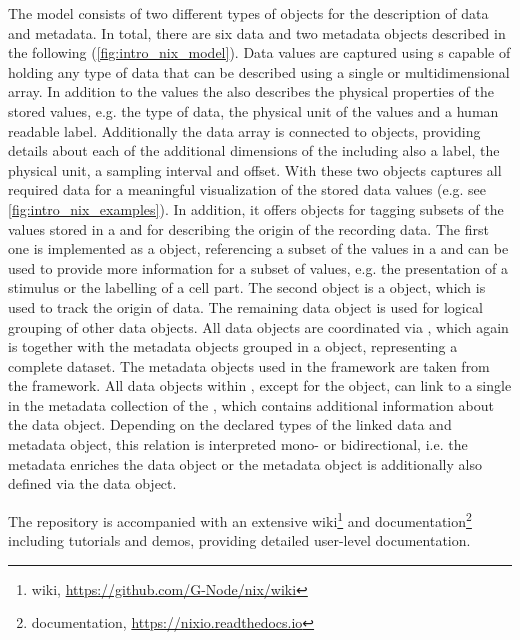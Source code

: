 The  model consists of two different types of objects for the description of data and metadata. In total, there are six data and two metadata objects  described in the following (\ref{fig:intro_nix_model}).
Data values are captured using s capable of holding any type of data that can be described using a single or multidimensional array. In addition to the values the  also describes the physical properties of the stored values, e.g. the type of data, the physical unit of the values and a human readable label. Additionally the data array is connected to  objects, providing details about each of the additional dimensions of the  including also a label, the physical unit, a sampling interval and offset. With these two objects  captures all required data for a meaningful visualization of the stored data values (e.g. see \cref{fig:intro_nix_examples}). In addition, it offers objects for tagging subsets of the values stored in a  and for describing the origin of the recording data. The first one is implemented as a  object, referencing a subset of the values in a  and can be used to provide more information for a subset of values, e.g. the presentation of a stimulus or the labelling of a cell part. The second object is a  object, which is used to track the origin of data. The remaining data object  is used for logical grouping of other  data objects. All data objects are coordinated via , which again is together with the metadata objects grouped in a   object, representing a complete dataset.
The metadata objects used in the  framework are taken from the  framework. All data objects within , except for the  object, can link to a single  in the metadata collection of the  , which contains additional information about the data object. Depending on the declared types of the linked data and metadata object, this relation is interpreted mono- or bidirectional, i.e. the metadata  enriches the data object or the metadata object is additionally also defined via the data object.

The  repository is accompanied with an extensive wiki\footnote{ wiki, \url{https://github.com/G-Node/nix/wiki}} and documentation\footnote{ documentation, \url{https://nixio.readthedocs.io}} including tutorials and demos, providing detailed user-level documentation.

